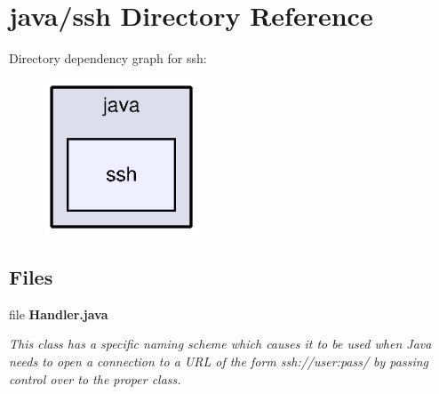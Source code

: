 \section{java/ssh Directory Reference}
\label{dir_78f1eca83964fe61d8b36350cd844585}
Directory dependency graph for ssh\+:
\nopagebreak
\begin{figure}[H]
\begin{center}
\leavevmode
\includegraphics[width=130pt]{dir_78f1eca83964fe61d8b36350cd844585_dep}
\end{center}
\end{figure}
\subsection*{Files}
\begin{DoxyCompactItemize}
\item 
file {\bf Handler.\+java}
\begin{DoxyCompactList}\small\item\em This class has a specific naming scheme which causes it to be used when Java needs to open a connection to a U\+R\+L of the form ssh\+://user\+:pass/ by passing control over to the proper class. \end{DoxyCompactList}\end{DoxyCompactItemize}
